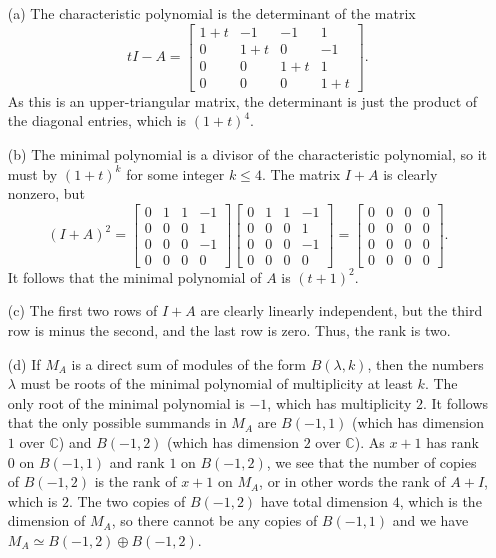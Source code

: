\documentclass{amsart}
\newcommand{\bbm}       {\left[\begin{matrix}}
\newcommand{\ebm}       {\end{matrix}\right]}
\newcommand{\C}         {{\mathbb{C}}}
\newcommand{\lm}        {\lambda}
\newcommand{\op}        {\oplus}
\renewcommand{\:}{\colon}
\theoremstyle{definition}
\renewenvironment{solution}{\SolutionAtEnd}{\endSolutionAtEnd}
\begin{document}
\begin{solution}
 \begin{itemize}
  \item[(a)] The characteristic polynomial is the determinant of the
   matrix 
   \[ tI - A =
       \bbm 1+t&-1&-1&1 \\ 0&1+t&0&-1 \\ 0&0&1+t&1 \\ 0&0&0&1+t
       \ebm.
   \]
   As this is an upper-triangular matrix, the determinant is just the
   product of the diagonal entries, which is $(1+t)^4$.
  \item[(b)] The minimal polynomial is a divisor of the characteristic
   polynomial, so it must by $(1+t)^k$ for some integer $k\leq 4$.
   The matrix $I+A$ is clearly nonzero, but 
   \[ (I+A)^2 = 
      \bbm 0&1&1&-1 \\ 0&0&0&1 \\ 0&0&0&-1 \\ 0&0&0&0 \ebm
      \bbm 0&1&1&-1 \\ 0&0&0&1 \\ 0&0&0&-1 \\ 0&0&0&0 \ebm = 
      \bbm 0&0&0&0 \\ 0&0&0&0 \\ 0&0&0&0 \\ 0&0&0&0 \ebm.
   \]
   It follows that the minimal polynomial of $A$ is $(t+1)^2$.
  \item[(c)] The first two rows of $I+A$ are clearly linearly
   independent, but the third row is minus the second, and the last
   row is zero.  Thus, the rank is two.
  \item[(d)] If $M_A$ is a direct sum of modules of the form
   $B(\lm,k)$, then the numbers $\lm$ must be roots of the minimal
   polynomial of multiplicity at least $k$.  The only root of the
   minimal polynomial is $-1$, which has multiplicity $2$.  It follows
   that the only possible summands in $M_A$ are $B(-1,1)$ (which has
   dimension $1$ over $\C$) and $B(-1,2)$ (which has dimension $2$
   over $\C$).  As $x+1$ has rank $0$ on $B(-1,1)$ and rank $1$ on
   $B(-1,2)$, we see that the number of copies of $B(-1,2)$ is the
   rank of $x+1$ on $M_A$, or in other words the rank of $A+I$, which
   is $2$.  The two copies of $B(-1,2)$ have total dimension $4$,
   which is the dimension of $M_A$, so there cannot be any copies of
   $B(-1,1)$ and we have $M_A\simeq B(-1,2)\op B(-1,2)$.
 \end{itemize}
\end{solution}
\end{document}
